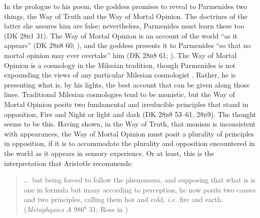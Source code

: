 In the prologue to his poem, the goddess promises to reveal to Parmenides two things, the Way of Truth and the Way of Mortal Opinion. The doctrines of the latter she assures him are false; nevertheless, Parmenides must learn these too (DK 28\textsc{b}1 31). The Way of Mortal Opinion is an account of the world ``as it appears'' (DK 28\textsc{b}8 60; \citealt[155]{McKirahan:1994ve}), and the goddess presents it to Parmenides ``so that no mortal opinion may ever overtake'' him (DK 28\textsc{b}8 61; \citealt[155]{McKirahan:1994ve}). The Way of Mortal Opinion is a cosmology in the Milesian tradition, though Parmenides is not expounding the views of any particular Milesian cosmologist \citep[on Parmenides and Milesian cosmology see][]{Kahn:1994qf}. Rather, he is presenting what is, by his lights, the best account that can be given along those lines. Traditional Milesian cosmologies tend to be monistic, but the Way of Mortal Opinion posits two fundamental and irreducible principles that stand in opposition, Fire and Night or light and dark (DK 28\textsc{b}8 53--61, 28\textsc{b}9). The thought seems to be this. Having shown, in the Way of Truth, that monism is inconsistent with appearances, the Way of Mortal Opinion must posit a plurality of principles in opposition, if it is to accommodate the plurality and opposition encountered in the world as it appears in sensory experience. Or at least, this is the interpretation that Aristotle recommends:
\begin{quote}
    \ldots\ but being forced to follow the phenomena, and supposing that what is is one in formula but many according to perception, he now posits two causes and two principles, calling them hot and cold, \emph{i.e.} fire and earth. (\emph{Metaphysics} \( A \) 986\( ^{b} \) 31; Ross in \citealt[]{Barnes:1984kx})
\end{quote}

